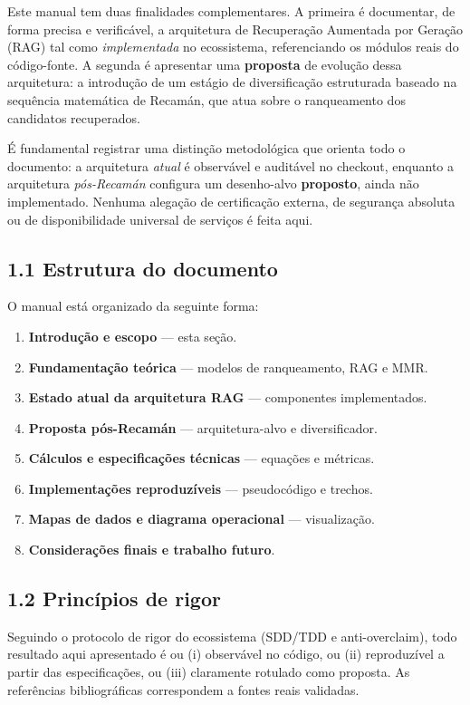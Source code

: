\documentclass[
	article,
	11pt,
	oneside,
	a4paper,
	english,
	brazil,
	sumario=tradicional
	]{abntex2}
\begin{document}
Este manual tem duas finalidades complementares. A primeira é documentar, de
forma precisa e verificável, a arquitetura de Recuperação Aumentada por Geração
(RAG) tal como \emph{implementada} no ecossistema, referenciando os módulos reais
do código-fonte. A segunda é apresentar uma \textbf{proposta} de evolução dessa
arquitetura: a introdução de um estágio de diversificação estruturada baseado na
sequência matemática de Recamán, que atua sobre o ranqueamento dos candidatos
recuperados.

É fundamental registrar uma distinção metodológica que orienta todo o documento:
a arquitetura \emph{atual} é observável e auditável no checkout, enquanto a
arquitetura \emph{pós-Recamán} configura um desenho-alvo \textbf{proposto}, ainda
não implementado. Nenhuma alegação de certificação externa, de segurança absoluta
ou de disponibilidade universal de serviços é feita aqui.

\subsection*{1.1 Estrutura do documento}

O manual está organizado da seguinte forma:

\begin{enumerate}[label=\arabic*.]
  \item \textbf{Introdução e escopo} --- esta seção.
  \item \textbf{Fundamentação teórica} --- modelos de ranqueamento, RAG e MMR.
  \item \textbf{Estado atual da arquitetura RAG} --- componentes implementados.
  \item \textbf{Proposta pós-Recamán} --- arquitetura-alvo e diversificador.
  \item \textbf{Cálculos e especificações técnicas} --- equações e métricas.
  \item \textbf{Implementações reproduzíveis} --- pseudocódigo e trechos.
  \item \textbf{Mapas de dados e diagrama operacional} --- visualização.
  \item \textbf{Considerações finais e trabalho futuro}.
\end{enumerate}

\subsection*{1.2 Princípios de rigor}

Seguindo o protocolo de rigor do ecossistema (SDD/TDD e anti-overclaim), todo
resultado aqui apresentado é ou (i) observável no código, ou (ii) reproduzível a
partir das especificações, ou (iii) claramente rotulado como proposta. As
referências bibliográficas correspondem a fontes reais validadas.
\end{document}
